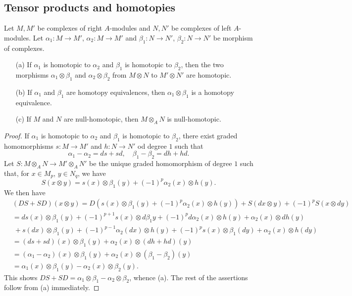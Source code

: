 \subsection{Tensor products and homotopies}
\begin{proposition}\label{module complex homotopy preserve under tensor}
Let $M,M'$ be complexes of right $A$-modules and $N,N'$ be complexes of left $A$-modules. Let $\alpha_1:M\to M'$, $\alpha_2:M\to M'$ and $\beta_1:N\to N'$, $\beta_2:N\to N'$ be morphism of complexes.
\begin{itemize}
\item[(a)] If $\alpha_1$ is homotopic to $\alpha_2$ and $\beta_1$ is homotopic to $\beta_2$, then the two morphisms $\alpha_1\otimes\beta_1$ and $\alpha_2\otimes\beta_2$ from $M\otimes N$ to $M'\otimes N'$ are homotopic.
\item[(b)] If $\alpha_1$ and $\beta_1$ are homotopy equivalences, then $\alpha_1\otimes\beta_1$ is a homotopy equivalence.
\item[(c)] If $M$ and $N$ are null-homotopic, then $M\otimes_AN$ is null-homotopic.
\end{itemize}
\end{proposition}
\begin{proof}
If $\alpha_1$ is homotopic to $\alpha_2$ and $\beta_1$ is homotopic to $\beta_2$, there exist graded homomorphisms $s:M\to M'$ and $h:N\to N'$ od degree $1$ such that
\[\alpha_1-\alpha_2=ds+sd,\quad \beta_1-\beta_2=dh+hd.\]
Let $S:M\otimes_AN\to M'\otimes_AN'$ be the unique graded homomorphism of degree $1$ such that, for $x\in M_p$, $y\in N_q$, we have
\[S(x\otimes y)=s(x)\otimes\beta_1(y)+(-1)^p\alpha_2(x)\otimes h(y).\]
We then have
\begin{align*}
&(DS+SD)(x\otimes y)=D(s(x)\otimes\beta_1(y)+(-1)^p\alpha_2(x)\otimes h(y))+S(dx\otimes y)+(-1)^pS(x\otimes dy)\\
&=ds(x)\otimes\beta_1(y)+(-1)^{p+1}s(x)\otimes d\beta_1y+(-1)^pd\alpha_2(x)\otimes h(y)+\alpha_2(x)\otimes dh(y)\\
&\ +s(dx)\otimes\beta_1(y)+(-1)^{p-1}\alpha_2(dx)\otimes h(y)+(-1)^ps(x)\otimes\beta_1(dy)+\alpha_2(x)\otimes h(dy)\\
&=(ds+sd)(x)\otimes\beta_1(y)+\alpha_2(x)\otimes(dh+hd)(y)\\
&=(\alpha_1-\alpha_2)(x)\otimes\beta_1(y)+\alpha_2(x)\otimes(\beta_1-\beta_2)(y)\\
&=\alpha_1(x)\otimes\beta_1(y)-\alpha_2(x)\otimes\beta_2(y).
\end{align*}
This shows $DS+SD=\alpha_1\otimes\beta_1-\alpha_2\otimes\beta_2$, whence (a). The rest of the assertions follow from (a) immediately.
\end{proof}
